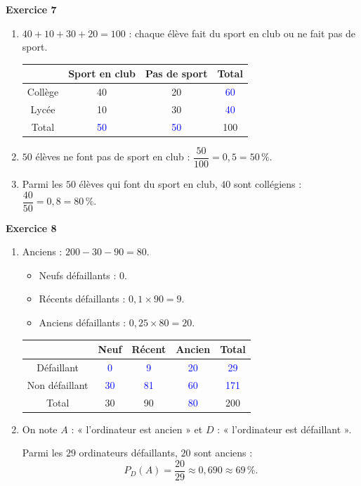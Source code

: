 \documentclass[a4paper,11pt]{article}
\newenvironment{exercice}[1]{%
  \Needspace{6\baselineskip}\par\bigskip\noindent\textbf{Exercice #1}\par\smallskip\noindent\ignorespaces
}{%
  \par
}
\newcommand{\val}[1]{\textcolor{blue}{#1}}
\begin{document}
\begin{exercice}{7}
\begin{enumerate}[label=\arabic*.]
\item $40+10+30+20=100$ : chaque élève fait du sport en club ou ne fait pas de sport.

\begin{center}
\begin{tabular}{|c|c|c|c|}
\hline
 & Sport en club & Pas de sport & Total \\ \hline
Collège & 40 & 20 & \val{60} \\ \hline
Lycée & 10 & 30 & \val{40} \\ \hline
Total & \val{50} & \val{50} & 100 \\ \hline
\end{tabular}
\end{center}
\item $50$ élèves ne font pas de sport en club : $\dfrac{50}{100}=0{,}5=50\,\%$.
\item Parmi les $50$ élèves qui font du sport en club, $40$ sont collégiens : $\dfrac{40}{50}=0{,}8=80\,\%$.
\end{enumerate}
\end{exercice}

\begin{exercice}{8}
\begin{enumerate}[label=\arabic*.]
\item Anciens : $200-30-90=80$.
\begin{itemize}[label=$\bullet$]
\item Neufs défaillants : $0$.
\item Récents défaillants : $0{,}1\times 90=9$.
\item Anciens défaillants : $0{,}25\times 80=20$.
\end{itemize}

\begin{center}
\begin{tabular}{|c|c|c|c|c|}
\hline
 & Neuf & Récent & Ancien & Total \\ \hline
Défaillant & \val{0} & \val{9} & \val{20} & \val{29} \\ \hline
Non défaillant & \val{30} & \val{81} & \val{60} & \val{171} \\ \hline
Total & 30 & 90 & \val{80} & 200 \\ \hline
\end{tabular}
\end{center}
\item On note $A$ : « l'ordinateur est ancien » et $D$ : « l'ordinateur est défaillant ».

Parmi les $29$ ordinateurs défaillants, $20$ sont anciens :
\[P_D(A)=\dfrac{20}{29}\approx 0{,}690\approx 69\,\%.\]
\end{enumerate}
\end{exercice}
\end{document}
